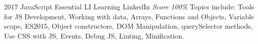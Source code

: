 \documentclass[11pt,a4paper]{moderncv}
\begin{document}
\cventry                                                          %
    {2017}                                                          %
    {JavaScript Essential}                                                          %
    {LI Learning}                                                          %
    {LinkedIn}                                                          %
    {\textit{Score 100\%}}                                                          %
    {                                                          %
        Topics include:                                                          %
            Tools for JS Development,                                                          %
            Working with data,                                                          %
            Arrays,                                                          %
            Functions and Objects,                                                          %
            Variable scope,                                                          %
            ES2015,                                                          %
            Object constructors,                                                          %
            DOM Manipulation,                                                          %
            querySelector methods,                                                          %
            Use CSS with JS,                                                          %
            Events,                                                          %
            Debug JS,                                                          %
            Linting,                                                          %
            Minification.                                                          %
    }                                                          %
\end{document}
